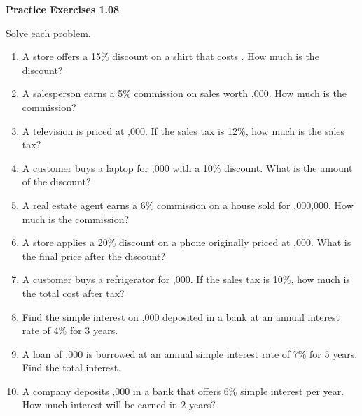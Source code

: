 \vspace{0.3ex}
\noindent\textbf{Practice Exercises 1.08}

\vspace{0.2ex}

Solve each problem.
\begin{enumerate}
    \item A store offers a 15\% discount on a shirt that costs . How much is the discount?
    \item A salesperson earns a 5\% commission on sales worth ,000. How much is the commission?
    \item A television is priced at ,000. If the sales tax is 12\%, how much is the sales tax?
    \item A customer buys a laptop for ,000 with a 10\% discount. What is the amount of the discount?
    \item A real estate agent earns a 6\% commission on a house sold for ,000,000. How much is the commission?
    \item A store applies a 20\% discount on a phone originally priced at ,000. What is the final price after the discount?
    \item A customer buys a refrigerator for ,000. If the sales tax is 10\%, how much is the total cost after tax?
    \item Find the simple interest on ,000 deposited in a bank at an annual interest rate of 4\% for 3 years.
    \item A loan of ,000 is borrowed at an annual simple interest rate of 7\% for 5 years. Find the total interest.
    \item A company deposits ,000 in a bank that offers 6\% simple interest per year. How much interest will be earned in 2 years?
\end{enumerate}
